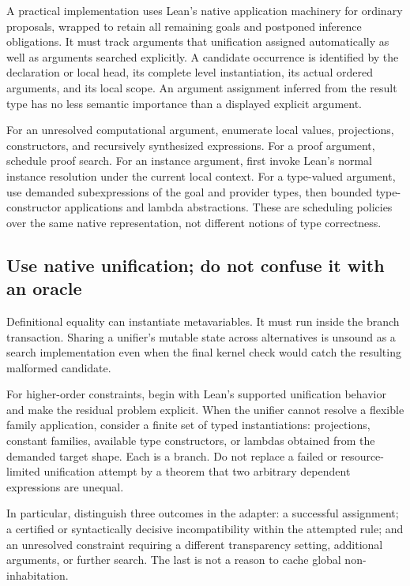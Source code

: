 A practical implementation uses Lean's native application machinery for ordinary proposals, wrapped to retain all remaining goals and postponed inference obligations. It must track arguments that unification assigned automatically as well as arguments searched explicitly. A candidate occurrence is identified by the declaration or local head, its complete level instantiation, its actual ordered arguments, and its local scope. An argument assignment inferred from the result type has no less semantic importance than a displayed explicit argument.

For an unresolved computational argument, enumerate local values, projections, constructors, and recursively synthesized expressions. For a proof argument, schedule proof search. For an instance argument, first invoke Lean's normal instance resolution under the current local context. For a type-valued argument, use demanded subexpressions of the goal and provider types, then bounded type-constructor applications and lambda abstractions. These are scheduling policies over the same native representation, not different notions of type correctness.

\subsection{Use native unification; do not confuse it with an oracle}
Definitional equality can instantiate metavariables. It must run inside the branch transaction. Sharing a unifier's mutable state across alternatives is unsound as a search implementation even when the final kernel check would catch the resulting malformed candidate.

For higher-order constraints, begin with Lean's supported unification behavior and make the residual problem explicit. When the unifier cannot resolve a flexible family application, consider a finite set of typed instantiations: projections, constant families, available type constructors, or lambdas obtained from the demanded target shape. Each is a branch. Do not replace a failed or resource-limited unification attempt by a theorem that two arbitrary dependent expressions are unequal.

In particular, distinguish three outcomes in the adapter: a successful assignment; a certified or syntactically decisive incompatibility within the attempted rule; and an unresolved constraint requiring a different transparency setting, additional arguments, or further search. The last is not a reason to cache global non-inhabitation.

